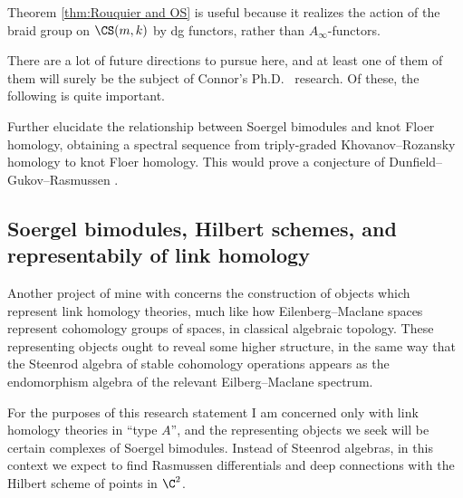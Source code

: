 \documentclass[11pt]{amsart}
\begin{document}
\begin{remark}
Theorem \ref{thm:Rouquier and OS} is useful because it realizes the action of the braid group on $\CS(m,k)$ by dg functors, rather than $A_\infty$-functors.
\end{remark}

There are a lot of future directions to pursue here, and at least one of them  of them will surely be the subject of Connor's Ph.D.~ research.  Of these, the following is quite important.

\begin{problem}\label{prob:HHH to HFK}
Further elucidate the relationship between Soergel bimodules and knot Floer homology, obtaining a spectral sequence from triply-graded Khovanov--Rozansky homology to knot Floer homology. This would prove a conjecture of Dunfield--Gukov--Rasmussen \cite{DGR}.
\end{problem}




\subsection{Soergel bimodules, Hilbert schemes, and representabily of link homology}
\label{s:traces}
Another project of mine with concerns the construction of objects which represent link homology theories, much like how Eilenberg--Maclane spaces represent cohomology groups of spaces, in classical algebraic topology.  These representing objects ought to reveal some higher structure, in the same way that the Steenrod algebra of stable cohomology operations appears as the endomorphism algebra of the relevant Eilberg--Maclane spectrum.

For the purposes of this research statement I am concerned only with link homology theories in ``type $A$'', and the representing objects we seek will be certain complexes of Soergel bimodules.  Instead of Steenrod algebras, in this context we expect to find Rasmussen differentials and deep connections with the Hilbert scheme of points in $\C^2$.%
\end{document}
